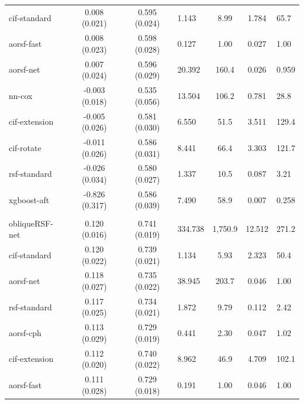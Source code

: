 \documentclass[twoside,11pt]{article}\usepackage[]{graphicx}\usepackage[]{xcolor}
\newenvironment{knitrout}{}{} %
\begin{document}
\begin{knitrout}
\begin{longtable}{lcclccl}
\hspace{1em}cif-standard & 0.008 (0.021) & 0.595 (0.024) & 1.143 & 8.99 & 1.784 & 65.7\\
\hspace{1em}aorsf-fast & 0.008 (0.023) & 0.598 (0.028) & 0.127 & 1.00 & 0.027 & 1.00\\
\hspace{1em}aorsf-net & 0.007 (0.024) & 0.596 (0.029) & 20.392 & 160.4 & 0.026 & 0.959\\
\hspace{1em}nn-cox & -0.003 (0.018) & 0.535 (0.056) & 13.504 & 106.2 & 0.781 & 28.8\\
\hspace{1em}cif-extension & -0.005 (0.026) & 0.581 (0.030) & 6.550 & 51.5 & 3.511 & 129.4\\
\hspace{1em}cif-rotate & -0.011 (0.026) & 0.586 (0.031) & 8.441 & 66.4 & 3.303 & 121.7\\
\hspace{1em}rsf-standard & -0.026 (0.034) & 0.580 (0.027) & 1.337 & 10.5 & 0.087 & 3.21\\
\hspace{1em}xgboost-aft & -0.826 (0.317) & 0.586 (0.039) & 7.490 & 58.9 & 0.007 & 0.258\\
\addlinespace[0.3em]
\hline
\multicolumn{7}{l}{\textit{\textbf{GBSG II; recurrence or death, n = 686, p = 10}}}\\
\hline
\hspace{1em}obliqueRSF-net & 0.120 (0.016) & 0.741 (0.019) & 334.738 & 1,750.9 & 12.512 & 271.2\\
\hspace{1em}cif-standard & 0.120 (0.022) & 0.739 (0.021) & 1.134 & 5.93 & 2.323 & 50.4\\
\hspace{1em}aorsf-net & 0.118 (0.027) & 0.735 (0.022) & 38.945 & 203.7 & 0.046 & 1.00\\
\hspace{1em}rsf-standard & 0.117 (0.025) & 0.734 (0.021) & 1.872 & 9.79 & 0.112 & 2.42\\
\hspace{1em}aorsf-cph & 0.113 (0.029) & 0.729 (0.019) & 0.441 & 2.30 & 0.047 & 1.02\\
\hspace{1em}cif-extension & 0.112 (0.020) & 0.740 (0.022) & 8.962 & 46.9 & 4.709 & 102.1\\
\hspace{1em}aorsf-fast & 0.111 (0.028) & 0.729 (0.018) & 0.191 & 1.00 & 0.046 & 1.00\\

\end{longtable}
\end{knitrout}
\end{document}
